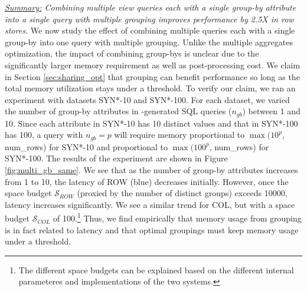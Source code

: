{\em \underline{Summary:} Combining multiple view queries each with a single group-by attribute into 
a single query with multiple grouping improves performance by 2.5X in row stores.}
We now study the effect of combining multiple queries each with a single group-by into one query
with multiple grouping.
Unlike the multiple aggregates optimization, the impact of combining group-bys
is unclear due to the significantly larger memory requirement as well as post-processing cost.
We claim in Section \ref{sec:sharing_opt} that grouping can benefit performance so long as 
the total memory utilization stays under a threshold.
To verify our claim, we ran an experiment with datasets SYN*-10 and SYN*-100.
For each dataset, we varied the number of group-by attributes in \SeeDB-generated SQL 
queries ($n_{gb}$) between 1 and 10.
Since each attribute in SYN*-10 has 10 distinct values and that in SYN*-100
has 100, a query with $n_{gb}=p$ will require memory proportional to $\max(10^p$,
num\_rows) for SYN*-10 and proportional to $\max(100^p$, num\_rows) for SYN*-100.
The results of the experiment are shown in Figure \ref{fig:multi_gb_same}.
We see that as the number of group-by attributes increases from 1 to 10, 
the latency of ROW (blue) decreases initially.
However, once the space budget $\mathcal{S}_{ROW}$ (proxied by the number of distinct groups) exceeds 10000, 
latency increases significantly.
We see a similar trend for COL, but with a space budget $\mathcal{S}_{COL}$ of 100.\footnote{\scriptsize The different space
budgets can be explained based on the different internal parameteres and implementations of
the two systems.}
Thus, we find empirically that memory usage from grouping is in fact related to latency and that 
optimal groupings must keep memory usage under a threshold.


